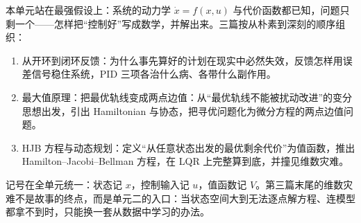 本单元站在最强假设上：系统的动力学 \(\dot x=f(x,u)\) 与代价函数都已知，问题只剩一个——怎样把``控制好''写成数学，并解出来。三篇按从朴素到深刻的顺序组织：

\begin{enumerate}
\def\labelenumi{\arabic{enumi}.}
\tightlist
\item
  从开环到闭环反馈：为什么事先算好的计划在现实中必然失效，反馈怎样用误差信号稳住系统，PID 三项各治什么病、各带什么副作用。
\item
  最大值原理：把最优轨线变成两点边值：从``最优轨线不能被扰动改进''的变分思想出发，引出 Hamiltonian 与协态，把寻优问题化为微分方程的两点边值问题。
\item
  HJB 方程与动态规划：定义``从任意状态出发的最优剩余代价''为值函数，推出 Hamilton--Jacobi--Bellman 方程，在 LQR 上完整算到底，并撞见维数灾难。
\end{enumerate}

记号在全单元统一：状态记 \(x\)，控制输入记 \(u\)，值函数记 \(V\)。第三篇末尾的维数灾难不是故事的终点，而是单元二的入口：当状态空间大到无法逐点解方程、连模型都拿不到时，只能换一套从数据中学习的办法。
